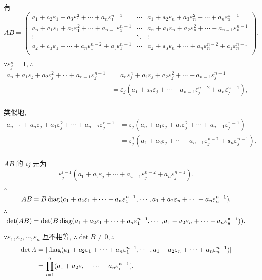 \documentclass[color=black,device=normal,lang=cn,mode=geye]{elegantnote}
\begin{document}
\begin{solution}
    有
    \[AB=\begin{pmatrix}
        a_1+a_2\varepsilon_1+a_3\varepsilon_1^2+\cdots+a_n\varepsilon_1^{n-1} & \cdots & a_1+a_2\varepsilon_n+a_3\varepsilon_n^2+\cdots+a_n\varepsilon_n^{n-1} \\
        a_n+a_1\varepsilon_1+a_2\varepsilon_1^2+\cdots+a_{n-1}\varepsilon_1^{n-1} & \cdots & a_n+a_1\varepsilon_n+a_2\varepsilon_n^2+\cdots+a_{n-1}\varepsilon_n^{n-1} \\
        \vdots & \ddots & \vdots \\
        a_2+a_3\varepsilon_1+\cdots+a_n\varepsilon_1^{n-2}+a_1\varepsilon_1^{n-1} & \cdots & a_2+a_3\varepsilon_n+\cdots+a_n\varepsilon_n^{n-2}+a_1\varepsilon_n^{n-1} \\
    \end{pmatrix}.\]

    $\because\varepsilon_j^n=1,\therefore$
    \begin{align*}
        a_n+a_1\varepsilon_j+a_2\varepsilon_j^2+\cdots+a_{n-1}\varepsilon_j^{n-1} & =a_n\varepsilon_j^n+a_1\varepsilon_j+a_2\varepsilon_j^2+\cdots+a_{n-1}\varepsilon_j^{n-1} \\
        & =\varepsilon_j(a_1+a_2\varepsilon_j+\cdots+a_{n-1}\varepsilon_j^{n-2}+a_n\varepsilon_j^{n-1}), \\
    \end{align*}

    类似地,
    \begin{align*}
        a_{n-1}+a_n\varepsilon_j+a_1\varepsilon_j^2+\cdots+a_{n-2}\varepsilon_j^{n-1} & =\varepsilon_j(a_n+a_1\varepsilon_j+a_2\varepsilon_j^2+\cdots+a_{n-1}\varepsilon_j^{n-1}) \\
        & =\varepsilon_j^2(a_1+a_2\varepsilon_j+\cdots+a_{n-1}\varepsilon_j^{n-2}+a_n\varepsilon_j^{n-1}), \\
    \end{align*}

    $AB$ 的 $ij$ 元为
    \[\varepsilon_j^{i-1}(a_1+a_2\varepsilon_j+\cdots+a_{n-1}\varepsilon_j^{n-2}+a_n\varepsilon_j^{n-1}).\]

    $\therefore$
    \[AB=B\operatorname{diag} (a_1+a_2\varepsilon_1+\cdots+a_n\varepsilon_1^{n-1},\cdots,a_1+a_2\varepsilon_n+\cdots+a_n\varepsilon_n^{n-1}).\]

    $\therefore$
    \[\det(AB)=\det(B\operatorname{diag} (a_1+a_2\varepsilon_1+\cdots+a_n\varepsilon_1^{n-1},\cdots,a_1+a_2\varepsilon_n+\cdots+a_n\varepsilon_n^{n-1})).\]

    $\because\varepsilon_1,\varepsilon_2,\cdots,\varepsilon_n$ 互不相等, $\therefore\det B\neq0,\therefore$
    \begin{align*}
        \det A & =|\operatorname{diag} (a_1+a_2\varepsilon_1+\cdots+a_n\varepsilon_1^{n-1},\cdots,a_1+a_2\varepsilon_n+\cdots+a_n\varepsilon_n^{n-1})| \\
        & =\prod\limits_{i=1}^n(a_1+a_2\varepsilon_i+\cdots+a_n\varepsilon_i^{n-1}). \\
    \end{align*}
\end{solution}
\end{document}
